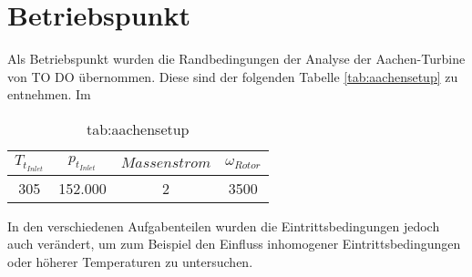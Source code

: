 \section{Betriebspunkt}
\label{subsec:aachensetup}
Als Betriebspunkt wurden die Randbedingungen der Analyse der Aachen-Turbine von TO DO übernommen. Diese sind der folgenden Tabelle \ref{tab:aachensetup} zu entnehmen. Im 
\begin{table}[H]
\centering
\caption{tab:aachensetup}
\begin{tabular}{ c| c| c| c}
$T_{t_{Inlet}}$&$p_{t_{Inlet}}$&$Massenstrom$&$\omega_{Rotor}$\\
\hline
305&152.000&2&3500\\
\end{tabular}
\end{table}
In den verschiedenen Aufgabenteilen wurden die Eintrittsbedingungen jedoch auch verändert, um zum Beispiel den Einfluss inhomogener Eintrittsbedingungen oder höherer Temperaturen zu untersuchen.






